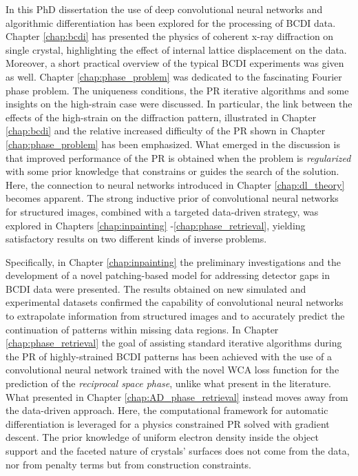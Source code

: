 In this PhD dissertation the use of deep convolutional neural networks and algorithmic differentiation has been 
explored for the processing of BCDI data. Chapter \ref{chap:bcdi} has presented the physics of coherent x-ray diffraction 
on single crystal, highlighting the effect of internal lattice displacement on the data. Moreover, a short practical 
overview of the typical BCDI experiments was given as well. Chapter \ref{chap:phase_problem} was dedicated to the fascinating 
Fourier phase problem. The uniqueness conditions, the PR iterative algorithms and some insights on the 
high-strain case were discussed. In particular, the link between the effects of the high-strain on the diffraction pattern, illustrated 
in Chapter \ref{chap:bcdi} and the relative increased difficulty of the PR shown in Chapter \ref{chap:phase_problem} has 
been emphasized. What emerged in the discussion is that improved performance of the PR is obtained when the problem is 
\textit{regularized} with some prior knowledge that constrains or guides the search of the solution. Here, the connection 
to neural networks introduced in Chapter \ref{chap:dl_theory} becomes apparent. The strong inductive prior of convolutional 
neural networks for structured images, combined with a targeted data-driven strategy, was explored in Chapters \ref{chap:inpainting}
-\ref{chap:phase_retrieval}, yielding satisfactory results on two different kinds of inverse problems. 


Specifically, 
in Chapter \ref{chap:inpainting} the preliminary 
investigations and the development of a novel patching-based model for addressing detector gaps in BCDI data were presented. 
The results obtained on new simulated and experimental datasets confirmed the capability of convolutional neural networks 
to extrapolate information from structured images and to accurately predict the continuation of patterns within missing 
data regions. 
In Chapter \ref{chap:phase_retrieval} the goal of assisting standard iterative algorithms during the PR 
of highly-strained BCDI patterns has been achieved with the use of a convolutional neural network trained with the novel 
WCA loss function for the prediction of the \textit{reciprocal space phase}, unlike what present in the literature. 
What presented in Chapter \ref{chap:AD_phase_retrieval} instead moves away from the data-driven approach. Here, the
computational framework for automatic differentiation is leveraged for a physics constrained PR solved 
with gradient descent. The prior knowledge of uniform electron density inside the object support and the faceted nature 
of crystals' surfaces does not come from the data, nor from penalty terms but from construction constraints. 

